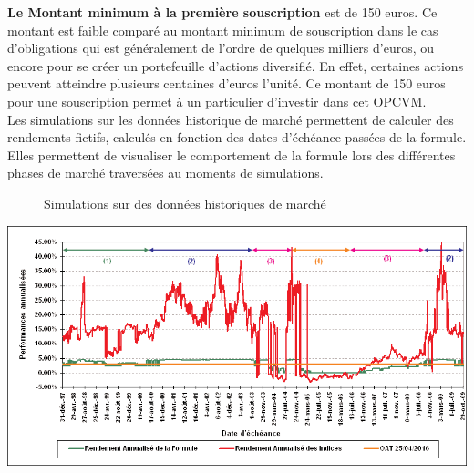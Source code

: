 \documentclass[french,12pt,a4paper]{article}
\begin{document}
\indent \textbf{Le Montant minimum à la première souscription} est de 150 euros. Ce montant est faible comparé au montant minimum de souscription dans le cas d'obligations qui est généralement de l'ordre de quelques milliers d'euros, ou encore pour se créer un portefeuille d'actions diversifié. En effet, certaines actions peuvent atteindre plusieurs centaines d'euros l'unité. Ce montant de 150 euros pour une souscription permet à un particulier d'investir dans cet OPCVM.\\
\indent Les simulations sur les données historique de marché permettent de calculer des rendements fictifs, calculés en fonction des dates d'échéance passées de la formule. Elles permettent de visualiser le comportement de la formule lors des différentes phases de marché traversées au moments de simulations.\\

\newpage
\begin{center}
\begin{figure}
\caption{Simulations sur des données historiques de marché}
\end{figure}
\end{center}

\begin{center}
\includegraphics[scale=0.5]{simulations_historiques.png}
\end{center}
\end{document}
